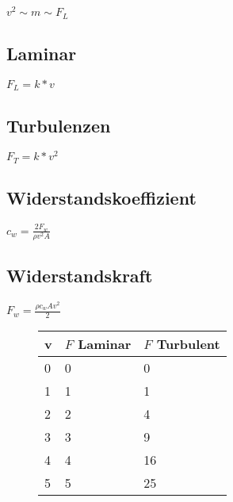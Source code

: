 \begin{multicols}{2}
	

\(v^2 \sim m \sim F_L\)

\subsection{Laminar}

\(F_L = k * v\)

\subsection{Turbulenzen}

\(F_T = k * v^2 \)

\subsection{Widerstandskoeffizient}

\( c_w = \frac{2F_w}{\rho v^2 A} \)

\subsection{Widerstandskraft}

\(F_w = \frac{\rho c_w A v^2}{2} \)

\begin{figure}
	\centering
	\begin{tabular}{|l|l|l|}
		\hline
		\textbf{v} & \textbf{\(F\) Laminar} & \textbf{\(F\) Turbulent} \\
		\hline
		0 & 0 & 0\\ \hline
		1 & 1 & 1\\ \hline
		2 & 2 & 4\\ \hline
		3 & 3 & 9\\ \hline
		4 & 4 & 16\\ \hline
		5 & 5 & 25\\ \hline
		
	\end{tabular}
	\caption{\label{fig:tablegraph}}
\end{figure}

\end{multicols}
